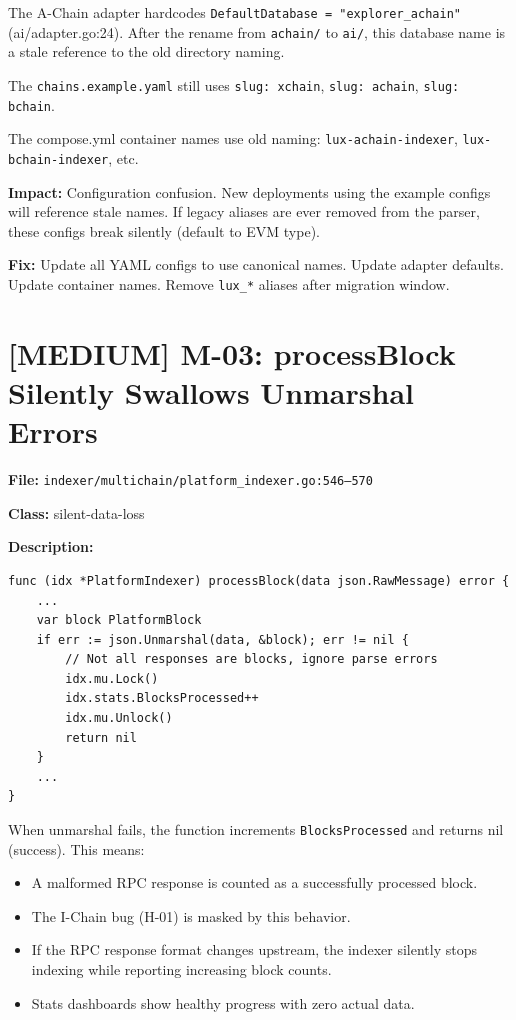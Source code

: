 \documentclass{article}
\begin{document}
The A-Chain adapter hardcodes \texttt{DefaultDatabase = "explorer\_achain"}
(ai/adapter.go:24). After the rename from \texttt{achain/} to \texttt{ai/},
this database name is a stale reference to the old directory naming.

The \texttt{chains.example.yaml} still uses \texttt{slug: xchain},
\texttt{slug: achain}, \texttt{slug: bchain}.

The compose.yml container names use old naming: \texttt{lux-achain-indexer},
\texttt{lux-bchain-indexer}, etc.

\textbf{Impact:} Configuration confusion. New deployments using the example
configs will reference stale names. If legacy aliases are ever removed from
the parser, these configs break silently (default to EVM type).

\textbf{Fix:} Update all YAML configs to use canonical names. Update adapter
defaults. Update container names. Remove \texttt{lux\_*} aliases after
migration window.


\section{[MEDIUM] M-03: processBlock Silently Swallows Unmarshal Errors}

\textbf{File:} \texttt{indexer/multichain/platform\_indexer.go:546--570}

\textbf{Class:} silent-data-loss

\textbf{Description:}
\begin{lstlisting}
func (idx *PlatformIndexer) processBlock(data json.RawMessage) error {
    ...
    var block PlatformBlock
    if err := json.Unmarshal(data, &block); err != nil {
        // Not all responses are blocks, ignore parse errors
        idx.mu.Lock()
        idx.stats.BlocksProcessed++
        idx.mu.Unlock()
        return nil
    }
    ...
}
\end{lstlisting}

When unmarshal fails, the function increments \texttt{BlocksProcessed} and
returns nil (success). This means:
\begin{itemize}
  \item A malformed RPC response is counted as a successfully processed block.
  \item The I-Chain bug (H-01) is masked by this behavior.
  \item If the RPC response format changes upstream, the indexer silently
        stops indexing while reporting increasing block counts.
  \item Stats dashboards show healthy progress with zero actual data.
\end{itemize}
\end{document}

